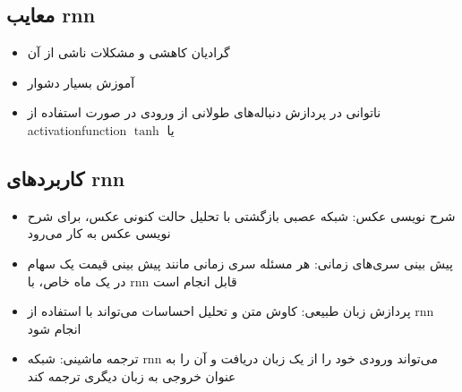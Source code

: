  \subsection{معایب \gls{rnn}}
 \begin{itemize}
 	\item گرادیان کاهشی و مشکلات ناشی از آن
 	\item آموزش بسیار دشوار
 	\item ناتوانی در پردازش دنباله‌های طولانی از ورودی در صورت استفاده از \gls{activationfunction}  $\tanh$ یا 
 \end{itemize}

\subsection{کاربردهای \gls{rnn}}
\begin{itemize}
	\item شرح نویسی عکس: شبکه عصبی بازگشتی با تحلیل حالت کنونی عکس، برای شرح نویسی عکس به کار می‌رود
	\item پیش بینی سری‌های زمانی: هر مسئله سری زمانی مانند پیش بینی قیمت یک سهام در یک ماه خاص، با \gls{rnn} قابل انجام است
	\item
	پردازش زبان طبیعی: کاوش متن و تحلیل احساسات می‌تواند با استفاده از \gls{rnn} انجام شود
	\item
	ترجمه ماشینی: شبکه \gls{rnn} می‌تواند ورودی خود را از یک زبان دریافت و آن را به عنوان خروجی به زبان دیگری ترجمه کند
\end{itemize}
 
